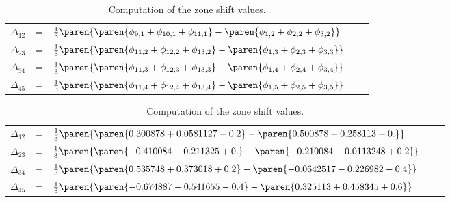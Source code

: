 \begin{table}[htbp]  %
    \caption{Computation of the zone shift values.}
    \begin{center}
        \begin{tabular}{lclcl}
            $\Delta_{12}$ & = & $\frac{1}{3} \paren{\paren{\phi_{9,1} + \phi_{10,1} + \phi_{11,1}} - \paren{\phi_{1,2} + \phi_{2,2} + \phi_{3,2}} }$ \\
            $\Delta_{23}$ & = & $\frac{1}{3} \paren{\paren{\phi_{11,2} + \phi_{12,2} + \phi_{13,2}} - \paren{\phi_{1,3} + \phi_{2,3} + \phi_{3,3}} }$ \\
            $\Delta_{34}$ & = & $\frac{1}{3} \paren{\paren{\phi_{11,3} + \phi_{12,3} + \phi_{13,3}} - \paren{\phi_{1,4} + \phi_{2,4} + \phi_{3,4}} }$ \\ 
            $\Delta_{45}$ & = & $\frac{1}{3} \paren{\paren{\phi_{11,4} + \phi_{12,4} + \phi_{13,4}} - \paren{\phi_{1,5} + \phi_{2,5} + \phi_{3,5}} }$      
        \end{tabular}
    \end{center}
\end{table}%

\begin{table}[htbp]  %
    \caption{Computation of the zone shift values.}
    \begin{center}
        \begin{tabular}{lclcl}
            $\Delta_{12}$ & = & $\frac{1}{3} \paren{\paren{ 0.300878 + 0.0581127 - 0.2 } - \paren{ 0.500878 + 0.258113 + 0. } }$ \\
            $\Delta_{23}$ & = & $\frac{1}{3} \paren{\paren{ -0.410084 - 0.211325 + 0. } - \paren{ -0.210084 - 0.0113248 + 0.2 } }$ \\
            $\Delta_{34}$ & = & $\frac{1}{3} \paren{\paren{ 0.535748 + 0.373018 + 0.2 } - \paren{ -0.0642517 - 0.226982 - 0.4 } }$ \\ 
            $\Delta_{45}$ & = & $\frac{1}{3} \paren{\paren{ -0.674887 - 0.541655 - 0.4 } - \paren{ 0.325113 + 0.458345 + 0.6 } }$      
        \end{tabular}
    \end{center}
\end{table}%

